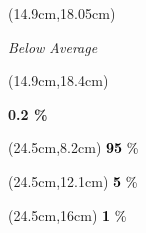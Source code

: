 \documentclass[
  11pt,
  landscape]{article}
\begin{document}
\begin{textblock*}{5cm}(14.9cm,18.05cm) %
    \small \centerline{\textit{Below Average}}
\end{textblock*}

\begin{textblock*}{5cm}(14.9cm,18.4cm) %
    \centerline{\textbf{0.2 \%}}
\end{textblock*}

\begin{textblock*}{2cm}(24.5cm,8.2cm) %
  \huge \textcolor{black}{\textbf{95} \huge \%}
\end{textblock*}

\begin{textblock*}{2cm}(24.5cm,12.1cm) %
  \huge \textcolor{black}{\textbf{5} \huge \%}
\end{textblock*}

\begin{textblock*}{2cm}(24.5cm,16cm) %
  \huge \textcolor{black}{\textbf{1} \huge \%}
\end{textblock*}

\vspace{2.75em}
\end{document}
